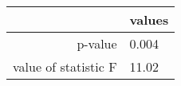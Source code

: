 \begin{tabular}{|r|l|}
  \hline
    & values \\
  \hline
  p-value & 0.004 \\
  \hline
  value of statistic F & 11.02 \\
  \hline
\end{tabular}
